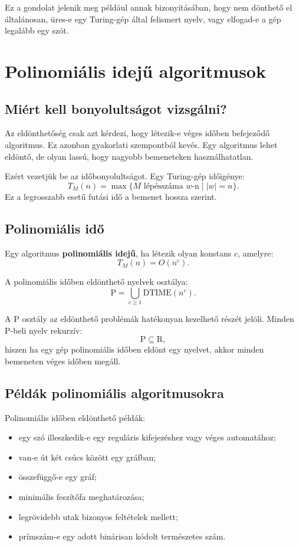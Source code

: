 Ez a gondolat jelenik meg például annak bizonyításában, hogy nem dönthető el általánosan, üres-e egy Turing-gép által felismert nyelv, vagy elfogad-e a gép legalább egy szót.

\section{Polinomiális idejű algoritmusok}

\subsection{Miért kell bonyolultságot vizsgálni?}

Az eldönthetőség csak azt kérdezi, hogy létezik-e véges időben befejeződő algoritmus. Ez azonban gyakorlati szempontból kevés. Egy algoritmus lehet eldöntő, de olyan lassú, hogy nagyobb bemeneteken használhatatlan.

Ezért vezetjük be az időbonyolultságot. Egy Turing-gép időigénye:
\[
  T_M(n)=\max\{\text{$M$ lépésszáma $w$-n}\mid |w|=n\}.
\]
Ez a legrosszabb esetű futási idő a bemenet hossza szerint.

\subsection{Polinomiális idő}

Egy algoritmus \textbf{polinomiális idejű}, ha létezik olyan konstans $c$, amelyre:
\[
  T_M(n)=O(n^c).
\]

A polinomiális időben eldönthető nyelvek osztálya:
\[
  \mathrm{P}=\bigcup_{c\geq 1}\mathrm{DTIME}(n^c).
\]

A $\mathrm{P}$ osztály az eldönthető problémák hatékonyan kezelhető részét jelöli. Minden $\mathrm{P}$-beli nyelv rekurzív:
\[
  \mathrm{P}\subseteq\mathrm{R},
\]
hiszen ha egy gép polinomiális időben eldönt egy nyelvet, akkor minden bemeneten véges időben megáll.

\begin{center}

\end{center}

\subsection{Példák polinomiális algoritmusokra}

Polinomiális időben eldönthető példák:

\begin{itemize}
  \item egy szó illeszkedik-e egy reguláris kifejezéshez vagy véges automatához;
  \item van-e út két csúcs között egy gráfban;
  \item összefüggő-e egy gráf;
  \item minimális feszítőfa meghatározása;
  \item legrövidebb utak bizonyos feltételek mellett;
  \item prímszám-e egy adott binárisan kódolt természetes szám.
\end{itemize}

